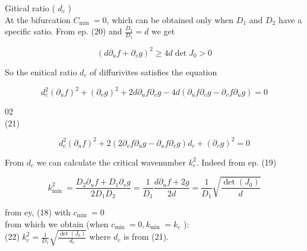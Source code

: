 \documentclass[10pt]{article}
\begin{document}
Gitical ratio ( $d_{c}$ )\\
At the bifurcation $C_{\text {min }}=0$, which can be obtained only when $D_{1}$ and $D_{2}$ have a specific satio. From ep. (20) and $\frac{D_{2}}{D_{1}}=d$ we get

$$
\left(d \partial_{u} f+\partial_{v} g\right)^{2} \geqslant 4 d \operatorname{det} J_{0}>0
$$

So the enitical ratio $d_{c}$ of diffurivites satisfies the equation

$$
d_{c}^{2}\left(\partial_{u} f\right)^{2}+\left(\partial_{v} g\right)^{2}+2 d \partial_{u} f \partial_{v} g-4 d\left(\partial_{u} f \partial_{v} g-\partial_{v} f \partial_{u} g\right)=0
$$

02\\
(21)

$$
d_{c}^{2}\left(\partial_{u} f\right)^{2}+2\left(2 \partial_{v} f \partial_{u} g-\partial_{u} f \partial_{v} g\right) d_{c}+\left(\partial_{v} g\right)^{2}=0
$$

From $d_{c}$ we can calculate the critical wavenumber $k_{c}^{2}$. Indeed from ep. (19)

$$
k_{\text {min }}^{2}=\frac{D_{2} \partial_{u} f+D_{1} \partial_{v} g}{2 D_{1} D_{2}}=\frac{1}{D_{1}} \frac{d \partial_{u} f+2 g}{2 d}=\frac{1}{D_{1}} \sqrt{\frac{\operatorname{det}\left(J_{0}\right)}{d}}
$$

from ey, (18) with $c_{\text {min }}=0$\\
from which we obtain (when $c_{\text {min }}=0, k_{\text {min }}=k_{c}$ ):\\
(22) $k_{c}^{2}=\frac{1}{D_{1}} \sqrt{\frac{\operatorname{det}\left(J_{0}\right)}{d_{c}}}$ where $d_{c}$ is from (21).
\end{document}
